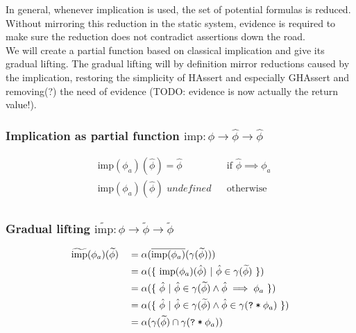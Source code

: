 \documentclass[11pt,a4paper]{article}
\newcommand{\grad}[1]{\widetilde{#1}}
\newcommand{\ttt}{\texttt}
\newcommand{\qm}{\ttt{?}}
\newcommand{\withqm}[1]{\ttt{\qm\:*\:$#1$}}
\newcommand{\imp}{\textrm{imp}}
\begin{document}
In general, whenever implication is used, the set of potential formulas is reduced. Without mirroring this reduction in the static system, evidence is required to make sure the reduction does not contradict assertions down the road.\\

We will create a partial function based on classical implication and give its gradual lifting.
The gradual lifting will by definition mirror reductions caused by the implication, restoring the simplicity of HAssert and especially GHAssert and removing(?) the need of evidence (TODO: evidence is now actually the return value!).\\


\subsubsection{Implication as partial function $\imp : \phi \rightarrow \hat{\phi} \rightarrow \hat{\phi}$}
\begin{align*}
&\imp(\phi_a)(\hat{\phi}) = \hat{\phi}                   &&\text{if $\hat{\phi} \implies \phi_a$}\\
&\imp(\phi_a)(\hat{\phi}) \textit{~undefined}      &&\text{otherwise}\\
\end{align*}

\subsubsection{Gradual lifting $\grad{\imp} : \phi \rightarrow \grad{\phi} \rightarrow \grad{\phi}$}
\begin{align*}
&\grad{\imp}(\phi_a)(\grad{\phi}) 
  &&= \alpha(\overline{\imp(\phi_a)}(\gamma(\grad{\phi})))\\
& &&= \alpha(\{~ \imp(\phi_a)(\hat{\phi}) ~|~ \hat{\phi} \in \gamma(\grad{\phi}) ~\})\\
& &&= \alpha(\{~ \hat{\phi} ~|~ \hat{\phi} \in \gamma(\grad{\phi}) \wedge \hat{\phi} \implies \phi_a ~\})\\
& &&= \alpha(\{~ \hat{\phi} ~|~ \hat{\phi} \in \gamma(\grad{\phi}) \wedge \hat{\phi} \in \gamma(\withqm{\phi_a}) ~\})\\
& &&= \alpha(\gamma(\grad{\phi}) \cap \gamma(\withqm{\phi_a}))\\
\end{align*}
\end{document}
